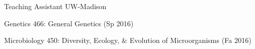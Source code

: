

\begin{cventries}

  \cventry
    {Teaching Assistant} %
    {UW-Madison} %
    {} %
    {} %
    {
      \begin{cvitems} %
        \item {Genetics 466: General Genetics (Sp 2016)}
        \item {Microbiology 450: Diversity, Ecology, \& Evolution of Microorganisms (Fa 2016)}
      \end{cvitems}
    }
    
\end{cventries}